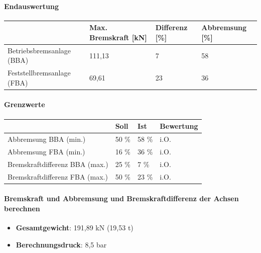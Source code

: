 \documentclass{vorlage-design-main}
\begin{document}
\paragraph{Endauswertung}\label{endauswertung}

\begin{table}[ht]
  \begin{tabular}{@{}llll@{}}
\toprule
&
Max. Bremskraft {[}kN{]}
 &
Differenz {[}\%{]}
 &
Abbremsung {[}\%{]}
 \\
\midrule[\heavyrulewidth]
Betriebsbremsanlage (BBA) & 111,13 & 7 & 58 \\
Feststellbremsanlage (FBA) & 69,61 & 23 & 36 \\
\bottomrule
\end{tabular}%
\end{table}

\paragraph{Grenzwerte}\label{grenzwerte}

\begin{table}[ht]
  \begin{tabular}{@{}llll@{}}
  \toprule

& Soll & Ist & Bewertung \\
\midrule[\heavyrulewidth]
Abbremsung BBA (min.) & 50 \% & 58 \% & i.O. \\
Abbremsung FBA (min.) & 16 \% & 36 \% & i.O. \\
Bremskraftdifferenz BBA (max.) & 25 \% & 7 \% & i.O. \\
Bremskraftdifferenz FBA (max.) & 50 \% & 23 \% & i.O. \\
  \bottomrule
  \end{tabular}%
\end{table}

\paragraph{Bremskraft und Abbremsung und Bremskraftdifferenz der Achsen
berechnen}\label{bremskraft-und-abbremsung-und-bremskraftdifferenz-der-achsen-berechnen}

\begin{itemize}

\item
  \textbf{Gesamtgewicht}: 191,89 kN (19,53 t)
\item
  \textbf{Berechnungsdruck}: 8,5 bar
\end{itemize}
\end{document}
